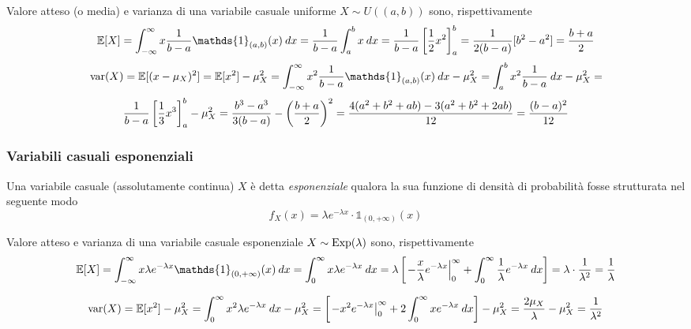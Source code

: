 \documentclass{article}
\begin{document}
                Valore atteso (o media) e varianza di una variabile casuale uniforme $X \sim U((a, b))$ sono, rispettivamente
                \[
                    \mathbb{E}[X] = \int_{-\infty}^{\infty} x \frac{1}{b - a}\mathds{1}_{(a, b)}(x) \: dx = 
                    \frac{1}{b - a} \int_{a}^{b} x \: dx = 
                    \frac{1}{b - a} \qty[\frac{1}{2}x^{2}]_{a}^{b} =
                    \frac{1}{2 (b - a)} [b^{2} - a^{2}] =
                    \frac{b + a}{2}
                \]
                \[
                    \textnormal{var}(X) = \mathbb{E}[(x - \mu_{X})^{2}] = 
                    \mathbb{E}[x^{2}] - \mu_{X}^{2} =
                    \int_{-\infty}^{\infty} x^{2} \frac{1}{b - a} \mathds{1}_{(a ,b)}(x) \: dx - \mu_{X}^{2} =
                    \int_{a}^{b} x^{2} \frac{1}{b - a} \: dx - \mu_{X}^{2} =
                \]
                \[
                    \frac{1}{b - a} \qty[\frac{1}{3} x^{3}]^{b}_{a} - \mu_{X}^{2} =
                    \frac{b^{3} - a^{3}}{3 (b - a)} - \qty(\frac{b + a}{2})^{2} =
                    \frac{4 (a^{2} + b^{2} + ab) - 3(a^{2} + b^{2} + 2ab)}{12} = \frac{(b - a)^{2}}{12}
                \]



            \vspace{10pt}
            \subsubsection{Variabili casuali esponenziali}
                Una variabile casuale (assolutamente continua) $X$ è detta \textit{esponenziale} qualora la sua funzione di densità di probabilità fosse strutturata nel seguente modo
                \[
                    f_{X}(x) = \lambda e^{-\lambda x} \cdot \mathds{1}_{(0, +\infty)}(x)
                \]

                Valore atteso e varianza di una variabile casuale esponenziale $X \sim \textnormal{Exp}(\lambda)$ sono, rispettivamente
                \[
                    \mathbb{E}[X] = \int_{-\infty}^{\infty} x \lambda e^{- \lambda x} \mathds{1}_{(0, +\infty)}(x) \: dx =
                    \int_{0}^{\infty} x \lambda e^{- \lambda x} \: dx =
                    \lambda \qty[\left. -\frac{x}{\lambda} e^{- \lambda x} \right|_{0}^{\infty} + \int_{0}^{\infty} \frac{1}{\lambda} e^{-\lambda x} \: dx] =
                    \lambda \cdot \frac{1}{\lambda^{2}} = 
                    \frac{1}{\lambda}
                \]

                \[
                    \textnormal{var}(X) = \mathbb{E}[x^{2}] - \mu_{X}^{2} =
                    \int_{0}^{\infty} x^{2} \lambda e^{- \lambda x} \: dx - \mu_{X}^{2} =
                    \qty[\left. - x^{2} e^{- \lambda x} \right|_{0}^{\infty} + 2 \int_{0}^{\infty} x e^{- \lambda x} \: dx] - \mu_{X}^{2} =
                    \frac{2 \mu_{X}}{\lambda} - \mu_{X}^{2} =
                    \frac{1}{\lambda^{2}}
                \]
\end{document}
